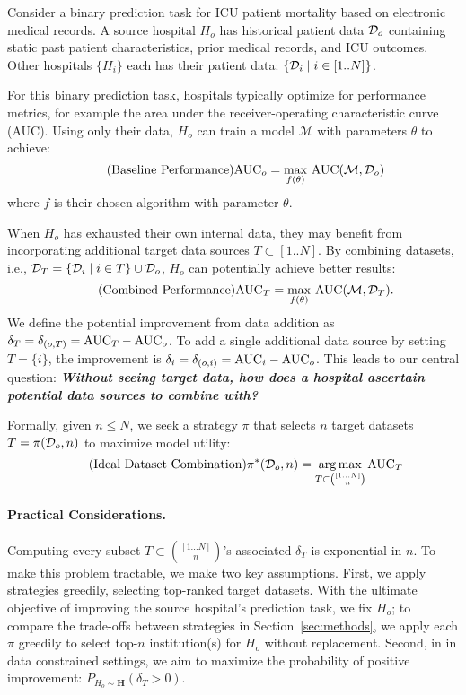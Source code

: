 Consider a binary prediction task for ICU patient mortality based on electronic medical records. A source hospital $H_o$ has historical patient data $\mathcal{D}_o$ containing static past patient characteristics, prior medical records, and ICU outcomes. Other hospitals $\{H_i\}$ each has their patient data: $\{\mathcal{D}_i \mid i\in [1.. N]\}$. 

For this binary prediction task, hospitals typically optimize for performance metrics, for example the area under the receiver-operating characteristic curve (AUC). Using only their data, $H_o$ can train a model $\mathcal{M}$ with parameters $\theta$ to achieve:
\begin{equation}
\tag{Baseline Performance}
\mathrm{AUC}_{o} = \max_{f(\theta)} \, \mathrm{AUC}(\mathcal{M}, \mathcal{D}_o)
\end{equation}
where $f$ is their chosen algorithm with parameter $\theta$.

When $H_o$ has exhausted their own internal data, they may benefit from incorporating additional target data sources $T\subset [1.. N]$. By combining datasets, i.e., $\mathcal{D}_T = \{\mathcal{D}_i\mid i\in T\}\cup \mathcal{D}_o$, $H_o$ can potentially achieve better results:
\begin{equation}
\tag{Combined Performance}
\mathrm{AUC}_T = \max_{f(\theta)} \, \mathrm{AUC}(\mathcal{M}, \mathcal{D}_T).
\end{equation}
We define the potential improvement from data addition as $\delta_{T} = \delta_{(o, T)} = \mathrm{AUC}_T-\mathrm{AUC}_{o}$. To add a single additional data source by setting $T=\{i\}$, the improvement is $\delta_{i} =\delta_{(o, i)}=\mathrm{AUC}_i-\mathrm{AUC}_{o}$.
This leads to our central question:
    \textbf{\emph{Without seeing target data, how does a hospital ascertain potential data sources to combine with?}}

Formally, given $n\leq N$, we seek a strategy $\pi$ that selects $n$ target datasets $T=\pi(\mathcal{D}_o, n)$ to maximize model utility:
\begin{equation}
\tag{Ideal Dataset Combination}
\pi^*(\Do, n) = \argmax_{T\subset {[1...N]\choose n}}\AUCT%
\end{equation}
\paragraph{Practical Considerations.} Computing every subset $T\subset {[1...N]\choose n}$'s associated $\delta_{T}$ is exponential in $n$. To make this problem tractable, we make two key assumptions. First, we apply strategies greedily, selecting top-ranked target datasets. With the ultimate objective of improving the source hospital's prediction task, we fix $H_o$; to compare the trade-offs between strategies in Section~\ref{sec:methods}, we apply each $\pi$ greedily to select top-$n$ institution(s) for $H_o$ without replacement. Second, in in data constrained settings, we aim to maximize the probability of positive improvement: $P_{H_o\sim \mathbf{H}}(\delta_T > 0)$. 
